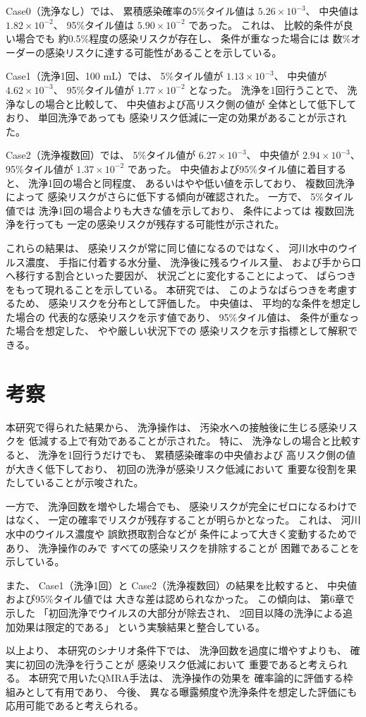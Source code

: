 Case0（洗浄なし）では、
累積感染確率の5\%タイル値は
$5.26\times10^{-3}$、
中央値は
$1.82\times10^{-2}$、
95\%タイル値は
$5.90\times10^{-2}$
であった。
これは、
比較的条件が良い場合でも
約0.5\%程度の感染リスクが存在し、
条件が重なった場合には
数\%オーダーの感染リスクに達する可能性があることを示している。

Case1（洗浄1回、100 mL）では、
5\%タイル値が
$1.13\times10^{-3}$、
中央値が
$4.62\times10^{-3}$、
95\%タイル値が
$1.77\times10^{-2}$
となった。
洗浄を1回行うことで、
洗浄なしの場合と比較して、
中央値および高リスク側の値が
全体として低下しており、
単回洗浄であっても
感染リスク低減に一定の効果があることが示された。

Case2（洗浄複数回）では、
5\%タイル値が
$6.27\times10^{-3}$、
中央値が
$2.94\times10^{-3}$、
95\%タイル値が
$1.37\times10^{-2}$
であった。
中央値および95\%タイル値に着目すると、
洗浄1回の場合と同程度、
あるいはやや低い値を示しており、
複数回洗浄によって
感染リスクがさらに低下する傾向が確認された。
一方で、
5\%タイル値では
洗浄1回の場合よりも大きな値を示しており、
条件によっては
複数回洗浄を行っても
一定の感染リスクが残存する可能性が示された。

これらの結果は、
感染リスクが常に同じ値になるのではなく、
河川水中のウイルス濃度、
手指に付着する水分量、
洗浄後に残るウイルス量、
および手から口へ移行する割合といった要因が、
状況ごとに変化することによって、
ばらつきをもって現れることを示している。
本研究では、
このようなばらつきを考慮するため、
感染リスクを分布として評価した。
中央値は、
平均的な条件を想定した場合の
代表的な感染リスクを示す値であり、
95\%タイル値は、
条件が重なった場合を想定した、
やや厳しい状況下での
感染リスクを示す指標として解釈できる。

\section{考察}

本研究で得られた結果から、
洗浄操作は、
汚染水への接触後に生じる感染リスクを
低減する上で有効であることが示された。
特に、
洗浄なしの場合と比較すると、
洗浄を1回行うだけでも、
累積感染確率の中央値および
高リスク側の値が大きく低下しており、
初回の洗浄が感染リスク低減において
重要な役割を果たしていることが示唆された。

一方で、
洗浄回数を増やした場合でも、
感染リスクが完全にゼロになるわけではなく、
一定の確率でリスクが残存することが明らかとなった。
これは、
河川水中のウイルス濃度や
誤飲摂取割合などが
条件によって大きく変動するためであり、
洗浄操作のみで
すべての感染リスクを排除することが
困難であることを示している。

また、
Case1（洗浄1回）と
Case2（洗浄複数回）の結果を比較すると、
中央値および95\%タイル値では
大きな差は認められなかった。
この傾向は、
第6章で示した
「初回洗浄でウイルスの大部分が除去され、
2回目以降の洗浄による追加効果は限定的である」
という実験結果と整合している。

以上より、
本研究のシナリオ条件下では、
洗浄回数を過度に増やすよりも、
確実に初回の洗浄を行うことが
感染リスク低減において
重要であると考えられる。
本研究で用いたQMRA手法は、
洗浄操作の効果を
確率論的に評価する枠組みとして有用であり、
今後、
異なる曝露頻度や洗浄条件を想定した評価にも
応用可能であると考えられる。

\enlargethispage{1\baselineskip}